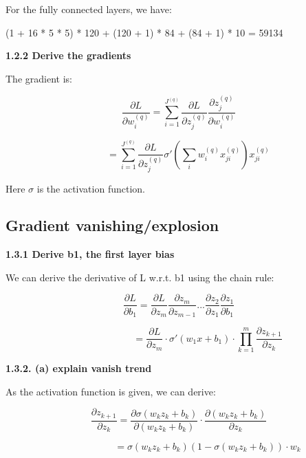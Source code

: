\documentclass{article} %
\begin{document}
For the fully connected layers, we have:

(1 + 16 * 5 * 5) * 120 + (120 + 1) * 84 + (84 + 1) * 10 = 59134

\textbf{1.2.2 Derive the gradients}

The gradient is:

\begin{equation}
\frac{\partial L}{\partial w_i^{(q)}} = 
\sum_{i=1}^{J^{(q)}} \frac{\partial L}{\partial z_j^{(q)}}
\frac{\partial z_j^{(q)}}{\partial w_i^{(q)}}
\end{equation}

\begin{equation}
\qquad =
\sum_{i=1}^{J^{(q)}} \frac{\partial L}{\partial z_j^{(q)}}
\sigma' (\sum_i w_i^{(q)} x_{ji}^{(q)}) x_{ji}^{(q)}
\end{equation}

Here $\sigma$ is the activation function.


\subsection{Gradient vanishing/explosion}

\textbf{1.3.1 Derive b1, the first layer bias}

We can derive the derivative of L w.r.t. b1 using the chain rule:

\begin{equation}
\frac{\partial L}{\partial b_1} =
\frac{\partial L}{\partial z_m} \frac{\partial z_m}{\partial z_{m-1}} ...
\frac{\partial z_{2}}{\partial z_{1}} \frac{\partial z_{1}}{\partial b_1}
\end{equation}

\begin{equation}
\qquad \qquad \qquad
= \frac{\partial L}{\partial z_m}
\cdot \sigma' (w_1 x + b_1)
\cdot \prod_{k=1}^m \frac{\partial z_{k+1}}{\partial z_k}
\end{equation}

\newpage
\textbf{1.3.2. (a) explain vanish trend}

As the activation function is given, we can derive:

\begin{equation}
\frac{\partial z_{k+1}}{\partial z_k} =
\frac{\partial \sigma (w_k z_k + b_k)}{\partial (w_k z_k + b_k)}
\cdot \frac{\partial (w_k z_k + b_k)}{\partial z_k}
\end{equation}

\begin{equation}
\qquad \qquad \qquad =
\sigma (w_k z_k + b_k) (1- \sigma (w_k z_k + b_k))
\cdot w_k
\end{equation}
\end{document}
